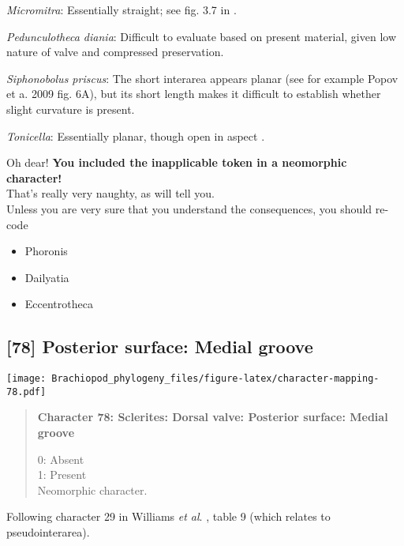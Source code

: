 \documentclass[openany]{book}
\providecommand{\tightlist}{%
  \setlength{\itemsep}{0pt}\setlength{\parskip}{0pt}}
\theoremstyle{definition}
\theoremstyle{definition}
\theoremstyle{definition}
\theoremstyle{remark}
\begin{document}
\hypertarget{Micromitra-coding-77}{}
\emph{Micromitra}: Essentially straight; see fig. 3.7 in
\citet{Ushatinskaya2016Protegulumand}.

\hypertarget{Pedunculotheca_diania-coding-77}{}
\emph{Pedunculotheca diania}: Difficult to evaluate based on present
material, given low nature of valve and compressed preservation.

\hypertarget{Siphonobolus_priscus-coding-77}{}
\emph{Siphonobolus priscus}: The short interarea appears planar (see for
example Popov et a. 2009 fig. 6A), but its short length makes it
difficult to establish whether slight curvature is present.

\hypertarget{Tonicella-coding-77}{}
\emph{Tonicella}: Essentially planar, though open in aspect
\citep[following Chiton in][]{Schwabe2010}.

Oh dear! \textbf{You included the inapplicable token in a neomorphic
character!}\\
That's really very naughty, as \citet{Brazeau2018} will tell you.\\
Unless you are very sure that you understand the consequences, you
should re-code

\begin{itemize}
\tightlist
\item
  Phoronis\\
\item
  Dailyatia\\
\item
  Eccentrotheca
\end{itemize}

\subsection*{{[}78{]} Posterior surface: Medial
groove}\label{posterior-surface-medial-groove}

\texttt{[image: Brachiopod\_phylogeny\_files/figure-latex/character-mapping-78.pdf]}

\begin{quote}
\textbf{Character 78: Sclerites: Dorsal valve: Posterior surface: Medial
groove}

0: Absent\\
1: Present\\
Neomorphic character.
\end{quote}

Following character 29 in Williams \emph{et al}.
\citeyearpar{Williams2000LinguliformeaCraniiformea}, table 9 (which
relates to pseudointerarea).
\end{document}
